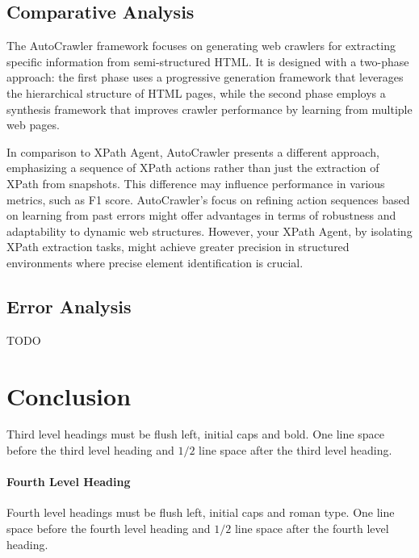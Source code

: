 \documentclass[a4paper]{article}
\begin{document}
\subsection{Comparative Analysis} 
The AutoCrawler\cite{huang2024autoscraperprogressiveunderstandingweb} framework focuses on generating web crawlers for extracting specific information from semi-structured HTML. 
It is designed with a two-phase approach: the first phase uses a progressive generation framework that leverages the hierarchical 
structure of HTML pages, while the second phase employs a synthesis framework that improves crawler performance by learning from 
multiple web pages. 

In comparison to XPath Agent, AutoCrawler presents a different approach, emphasizing a sequence of XPath actions rather than just the extraction of XPath from snapshots. This difference may influence performance in various metrics, such as F1 score. 
AutoCrawler's focus on refining action sequences based on learning from past errors might offer advantages in terms of robustness 
and adaptability to dynamic web structures. However, your XPath Agent, by isolating XPath extraction tasks, might achieve greater 
precision in structured environments where precise element identification is crucial.

\subsection{Error Analysis} TODO



\section{Conclusion }

Third level headings must be flush left, initial caps and bold.
One line space before the third level heading and $1/2$ line
space after the third level heading.

\paragraph{Fourth Level Heading}

Fourth level headings must be flush left, initial caps and roman type.
One line space before the fourth level heading and $1/2$ line
space after the fourth level heading.

% 
{}

\clearpage
\onecolumn
\end{document}
